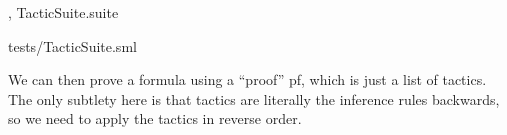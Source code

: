 \nwenddocs{}\endmoddef\nwstartdeflinemarkup\nwenddeflinemarkup
, TacticSuite.suite
\nwendcode{}\nwdocspar

\nwenddocs{}\endmoddef\nwstartdeflinemarkup\nwenddeflinemarkup
tests/TacticSuite.sml
\nwendcode{}\nwdocspar

\begin{node}
We can then prove a formula using a ``proof'' {\Tt{}pf\nwendquote}, which is just a
list of tactics. The only subtlety here is that tactics are literally
the inference rules backwards, so we need to apply the tactics in
reverse order.
\end{node}

